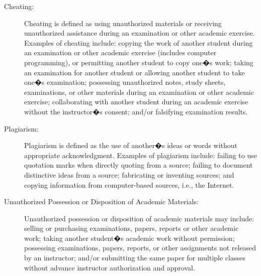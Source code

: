 \documentclass[11pt]{article}
\begin{document}
\begin{description}
\item[Cheating: ]
Cheating is defined as using unauthorized materials or receiving unauthorized assistance during an examination or other academic exercise. Examples of cheating include: copying the work of another student during an examination or other academic exercise (includes computer programming), or permitting another student to copy one�s work; taking an examination for another student or allowing another student to take one�s examination; possessing unauthorized notes, study sheets, examinations, or other materials during an examination or other academic exercise; collaborating with another student during an academic exercise without the instructor�s consent; and/or falsifying examination results.

\item[Plagiarism: ]
Plagiarism is defined as the use of another�s ideas or words without appropriate acknowledgment. Examples of plagiarism include: failing to use quotation marks when directly quoting from a source; failing to document distinctive ideas from a source; fabricating or inventing sources; and copying information from computer-based sources, i.e., the Internet.

\item[Unauthorized Possession or Disposition of Academic Materials: ]
Unauthorized possession or disposition of academic materials may include: selling or purchasing examinations, papers, reports or other academic work; taking another student�s academic work without permission; possessing examinations, papers, reports, or other assignments not released by an instructor; and/or submitting the same paper for multiple classes without advance instructor authorization and approval.

\end{description}
\end{document}

